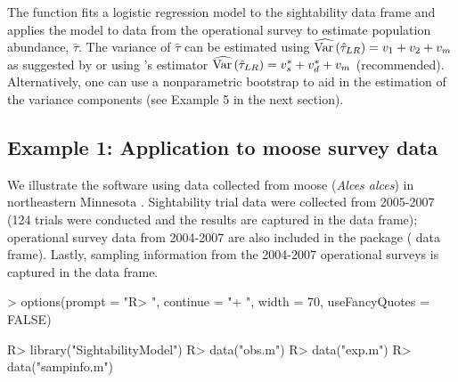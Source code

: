 \documentclass[nojss]{jss}
\def\VAR{{\rm Var}\,}
\begin{document}
      The  function
fits a logistic regression model to the sightability data frame and
applies the model to data from the operational survey to estimate
population abundance, $\hat{\tau}$.  The variance of  $\hat{\tau}$
can be estimated using $\widehat{\VAR}(\hat{\tau}_{LR}) =
v_{1}+v_{2} + v_{m}$ as suggested by \citet{samuel1992} or using
\citet{Wong1996}'s estimator $\widehat{\VAR}(\hat{\tau}_{LR}) =
v_{s}^{*} +v_{d}^{*}+v_{m}$ (recommended).  Alternatively, one can
use a nonparametric bootstrap to aid in the estimation of the
variance components (see Example 5 in the next section).


\subsection{ Example 1:  Application to moose survey data}
We illustrate the software using data collected from moose
(\emph{Alces alces}) in northeastern Minnesota \citep{GiudFieb2011}.
Sightability trial data were collected from 2005-2007 (124 trials
were conducted and the results are captured in the  data
frame); operational survey data from 2004-2007 are also included in
the package ( data frame).  Lastly, sampling information
from the 2004-2007 operational surveys is captured in the
 data frame.

\begin{Schunk}
\begin{Sinput}
>  options(prompt = "R> ", continue = "+  ", width = 70, useFancyQuotes = FALSE)
\end{Sinput}
\end{Schunk}
\begin{Schunk}
\begin{Sinput}
R>  library("SightabilityModel")
R>  data("obs.m")
R>  data("exp.m")
R>  data("sampinfo.m")
\end{Sinput}
\end{Schunk}
\end{document}
